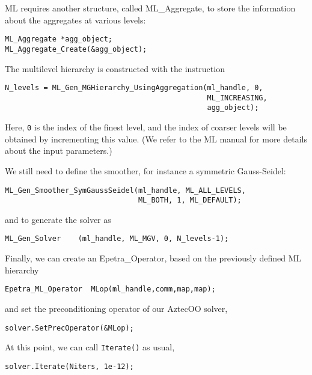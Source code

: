 ML requires another structure, called ML\_Aggregate, to store the
information about the aggregates at various levels:
\begin{verbatim}
ML_Aggregate *agg_object;
ML_Aggregate_Create(&agg_object);
\end{verbatim}

The multilevel hierarchy is constructed with the instruction
\begin{verbatim}
N_levels = ML_Gen_MGHierarchy_UsingAggregation(ml_handle, 0,
                                               ML_INCREASING,
                                               agg_object);
\end{verbatim}
Here, \verb!0! is the index of the finest level, and the index of
coarser levels will be obtained by incrementing this value.  (We refer
to the ML manual for more details about the input parameters.)

We still need to define the smoother, for instance a symmetric Gauss-Seidel:
\begin{verbatim}
ML_Gen_Smoother_SymGaussSeidel(ml_handle, ML_ALL_LEVELS,
                               ML_BOTH, 1, ML_DEFAULT);
\end{verbatim}
and to generate the solver as
\begin{verbatim}
ML_Gen_Solver    (ml_handle, ML_MGV, 0, N_levels-1);
\end{verbatim}

Finally, we can create an Epetra\_Operator, based on the previously
defined ML hierarchy
\begin{verbatim}
Epetra_ML_Operator  MLop(ml_handle,comm,map,map);
\end{verbatim}
and set the preconditioning operator of our AztecOO solver,
\begin{verbatim}
solver.SetPrecOperator(&MLop);
\end{verbatim}
 
At this point, we can call \verb!Iterate()! as usual,
\begin{verbatim}
solver.Iterate(Niters, 1e-12);
\end{verbatim}

